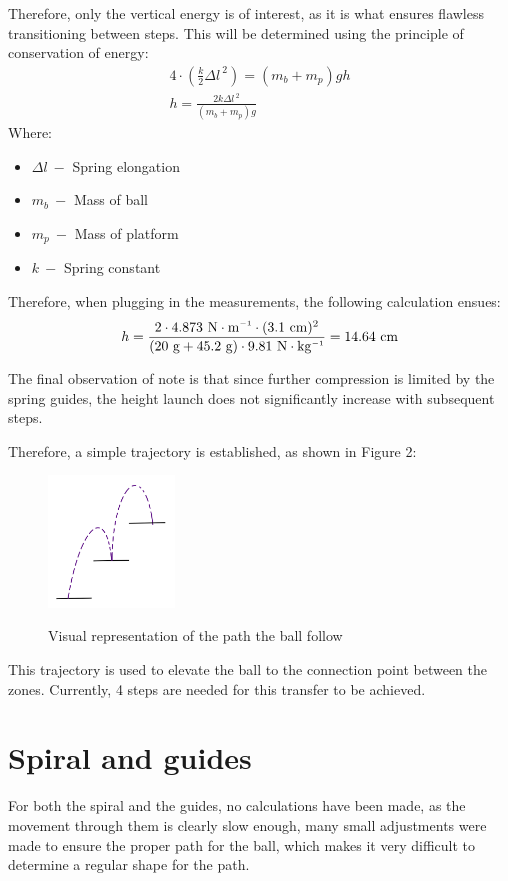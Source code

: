 \documentclass[a4paper]{article}
\newcommand{\inv}{^{\raisebox{.2ex}{$\scriptscriptstyle-1$}}}
\newcommand{\unit}[1]{~\mathrm{#1}}
\begin{document}
Therefore, only the vertical energy is of
interest, as it is what ensures flawless transitioning between steps. This will
be determined using the principle of conservation of energy:
\begin{gather}
    4\cdot 
    \left(\frac{k}{2}\Delta l ^{~2} \right) = (m_b + m_p)gh \\
    h = \frac{2k \Delta l^{~2}}{(m_b+m_p) g}  
\end{gather}
Where:
\begin{itemize}
    \item $\Delta l ~ -$ Spring elongation
    \item $m_b ~ -$ Mass of ball
    \item $m_p~ -$ Mass of platform
    \item $k~-$ Spring constant
\end{itemize}
Therefore, when plugging in the measurements, the following calculation ensues:
\[h = \frac{2 \cdot 4.873\unit{N\cdot m\inv} \cdot (3.1\unit{cm})^2}{(20\unit{g} +
45.2\unit{g})\cdot 9.81\unit{N\cdot kg\inv}} = 14.64\unit{cm}\]

The final observation of note is that since further compression is limited by
the spring guides, the height launch does not significantly increase with
subsequent steps.

Therefore, a simple trajectory is established, as shown in
Figure 2:

\begin{figure}[!ht]
    \centering
    \includegraphics[width=0.3\textwidth]{trajectory.png}
    \label{fig:2}
    \caption{Visual representation of the path the ball follow}
\end{figure}

This trajectory is used to elevate the ball to the connection point between the
zones. Currently, 4 steps are needed for this transfer to be achieved.

\section{Spiral and guides}
For both the spiral and the guides, no calculations have been made, as the
movement through them is clearly slow enough, many small adjustments were made
to ensure the proper path for the ball, which makes it very difficult to
determine a regular shape for the path.
\end{document}
